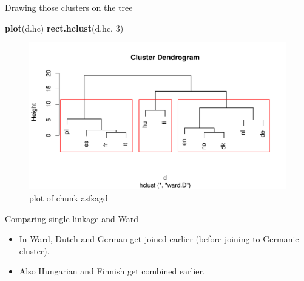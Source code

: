 \documentclass[ignorenonframetext,]{beamer}
\newenvironment{Shaded}{\begin{snugshade}}{\end{snugshade}}
\newcommand{\DecValTok}[1]{\textcolor[rgb]{0.00,0.00,0.81}{#1}}
\newcommand{\KeywordTok}[1]{\textcolor[rgb]{0.13,0.29,0.53}{\textbf{#1}}}
\newcommand{\NormalTok}[1]{#1}
\begin{document}
\begin{frame}[fragile]{Drawing those clusters on the tree}
\protect\hypertarget{drawing-those-clusters-on-the-tree}{}

\begin{Shaded}
\begin{Highlighting}[]
\KeywordTok{plot}\NormalTok{(d.hc)}
\KeywordTok{rect.hclust}\NormalTok{(d.hc, }\DecValTok{3}\NormalTok{)}
\end{Highlighting}
\end{Shaded}

\begin{figure}
\centering
\includegraphics{figure/asfsagd-1.pdf}
\caption{plot of chunk asfsagd}
\end{figure}

\end{frame}

\begin{frame}{Comparing single-linkage and Ward}
\protect\hypertarget{comparing-single-linkage-and-ward}{}

\begin{itemize}
\item
  In Ward, Dutch and German get joined earlier (before joining to
  Germanic cluster).
\item
  Also Hungarian and Finnish get combined earlier.
\end{itemize}

\end{frame}
\end{document}
